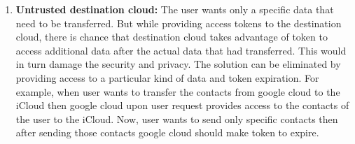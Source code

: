 \documentclass[11pt, pdftex, conference]{IEEEtran}
\begin{document}
\begin{enumerate}
\item \textbf{Untrusted destination cloud:} The user wants only a specific data that need to be transferred. But while providing access tokens to the destination cloud, there is chance that destination cloud takes advantage of token to access additional data after the actual data that had transferred. This would in turn damage the security and privacy. The solution can be eliminated by providing access to a particular kind of data and token expiration. For example, when user wants to transfer the contacts from google cloud to the iCloud then google cloud upon user request provides access to the contacts of the user to the iCloud. Now, user wants to send only specific contacts then after sending those contacts google cloud should make token to expire. 


\end{enumerate}
\end{document}
